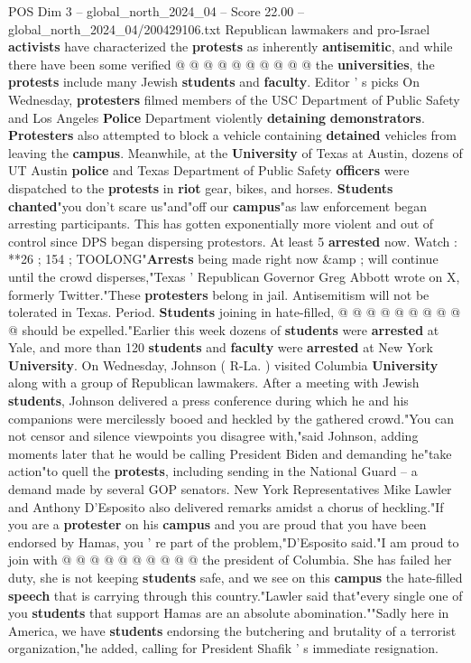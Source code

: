 \begin{textsample}{POS Dim 3 – global\_north\_2024\_04 – Score 22.00 – global\_north\_2024\_04/200429106.txt}
Republican lawmakers and pro-Israel \textbf{activists} have characterized the \textbf{protests} as inherently \textbf{antisemitic}, and while there have been some verified @ @ @ @ @ @ @ @ @ @ the \textbf{universities}, the \textbf{protests} include many Jewish \textbf{students} and \textbf{faculty}.
Editor ' s picks On Wednesday, \textbf{protesters} filmed members of the USC Department of Public Safety and Los Angeles \textbf{Police} Department violently \textbf{detaining} \textbf{demonstrators}. \textbf{Protesters} also attempted to block a vehicle containing \textbf{detained} vehicles from leaving the \textbf{campus}.
Meanwhile, at the \textbf{University} of Texas at Austin, dozens of UT Austin \textbf{police} and Texas Department of Public Safety \textbf{officers} were dispatched to the \textbf{protests} in \textbf{riot} gear, bikes, and horses. \textbf{Students} \textbf{chanted}"you don't scare us"and"off our \textbf{campus}"as law enforcement began arresting participants.
This has gotten exponentially more violent and out of control since DPS began dispersing protestors.
At least 5 \textbf{arrested} now.
Watch : **26 ; 154 ; TOOLONG"\textbf{Arrests} being made right now \&amp ; will continue until the crowd disperses,"Texas ' Republican Governor Greg Abbott wrote on X, formerly Twitter."These \textbf{protesters} belong in jail.
Antisemitism will not be tolerated in Texas.
Period. \textbf{Students} joining in hate-filled, @ @ @ @ @ @ @ @ @ @ should be expelled."Earlier this week dozens of \textbf{students} were \textbf{arrested} at Yale, and more than 120 \textbf{students} and \textbf{faculty} were \textbf{arrested} at New York \textbf{University}.
On Wednesday, Johnson ( R-La. ) visited Columbia \textbf{University} along with a group of Republican lawmakers.
After a meeting with Jewish \textbf{students}, Johnson delivered a press conference during which he and his companions were mercilessly booed and heckled by the gathered crowd."You can not censor and silence viewpoints you disagree with,"said Johnson, adding moments later that he would be calling President Biden and demanding he"take action"to quell the \textbf{protests}, including sending in the National Guard -- a demand made by several GOP senators.
New York Representatives Mike Lawler and Anthony D'Esposito also delivered remarks amidst a chorus of heckling."If you are a \textbf{protester} on his \textbf{campus} and you are proud that you have been endorsed by Hamas, you ' re part of the problem,"D'Esposito said."I am proud to join with @ @ @ @ @ @ @ @ @ @ the president of Columbia.
She has failed her duty, she is not keeping \textbf{students} safe, and we see on this \textbf{campus} the hate-filled \textbf{speech} that is carrying through this country."Lawler said that"every single one of you \textbf{students} that support Hamas are an absolute abomination.""Sadly here in America, we have \textbf{students} endorsing the butchering and brutality of a terrorist organization,"he added, calling for President Shafik ' s immediate resignation.


\end{textsample}
